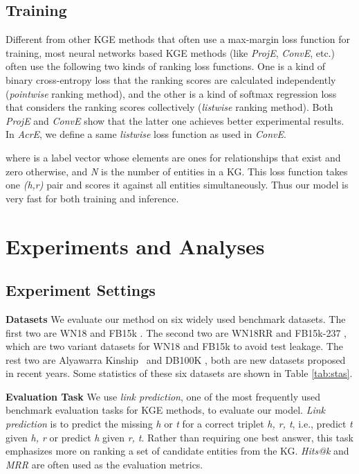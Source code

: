 \documentclass[11pt]{article}
\begin{document}
\subsection{Training}
Different from other KGE methods that often use a max-margin loss function for training, most neural networks based KGE methods (like \emph{ProjE}, \emph{ConvE}, etc.) often use the following two kinds of ranking loss functions. One is a kind of binary cross-entropy loss that the ranking scores are calculated independently (\emph{pointwise} ranking method), and the other is a kind of softmax regression loss that considers the ranking scores collectively (\emph{listwise} ranking method). Both \emph{ProjE} and \emph{ConvE} show that the latter one achieves better experimental results. In \emph{AcrE}, we define a same \emph{listwise} loss function as used in \emph{ConvE}.
 

where  is a label vector whose elements are ones for relationships that exist and zero otherwise, and \emph{N} is the number of entities in a KG. This loss function takes one \emph{(h,r)} pair and scores it against all entities simultaneously. Thus our model is very fast for both training and inference.



\section{Experiments and Analyses}


\subsection{Experiment Settings}
{\bf Datasets} We evaluate our method on six widely used benchmark datasets. The first two are WN18 \cite{Bordes:2014} and FB15k \cite{Bordes:2014}. The second two are  WN18RR and FB15k-237 \cite{Dettmers:2018}, which are two variant datasets for WN18 and FB15k to  avoid test leakage. The rest two are  Alyawarra Kinship~\cite{Lin:2018} and DB100K \cite{Ding:2018}, both are new datasets proposed in recent years. Some statistics of these six datasets are shown in Table \ref{tab:stas}.




\noindent\textbf{Evaluation Task} We use \emph{link prediction}, one of the most frequently used benchmark evaluation tasks for KGE methods, to evaluate our model. \emph{Link prediction} is to predict the missing \emph{h} or \emph{t} for a correct triplet \emph{h, r, t}, i.e., predict \emph{t} given \emph{h, r} or predict \emph{h} given \emph{r, t}. Rather than requiring one best answer, this task emphasizes more on ranking a set of candidate entities from the KG. \emph{Hits@k} and \emph{MRR} are often used as the evaluation metrics. 
\end{document}
